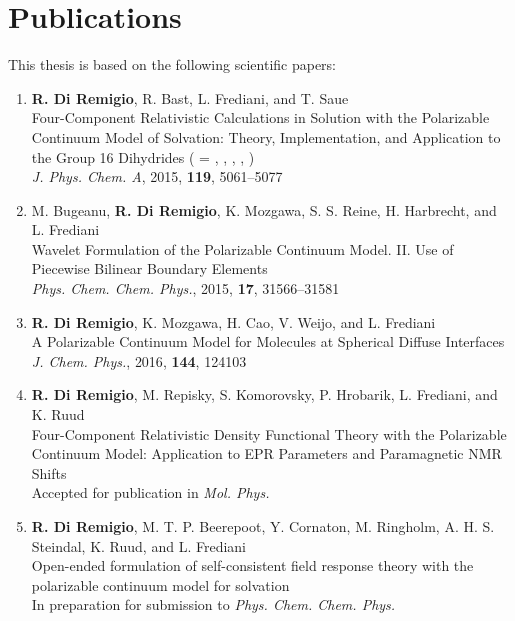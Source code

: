 \thispagestyle{empty}
\chapter*{Publications}

This thesis is based on the following scientific papers:

\begin{enumerate}[label=\textbf{\Roman{*} }, ref=\Roman{*}]

\item
  \textbf{R. Di Remigio}, R. Bast, L. Frediani, and T. Saue
  \\
  Four-Component Relativistic Calculations in Solution with the
  Polarizable Continuum Model of Solvation: Theory,
  Implementation, and Application to the Group 16 Dihydrides
   ( = , , , ,
  )
  \\
\textit{J. Phys. Chem. A}, \textrm{2015}, \textbf{119}, 5061--5077
\label{relapcm}

\item
  M. Bugeanu, \textbf{R. Di Remigio}, K. Mozgawa, S. S. Reine, H.
  Harbrecht,  and L. Frediani
  \\
  Wavelet Formulation of the Polarizable Continuum Model. II. Use of
  Piecewise Bilinear Boundary Elements
  \\
  \textit{Phys. Chem. Chem. Phys.}, \textrm{2015}, \textbf{17},
  31566--31581
\label{wemlin}

\item
  \textbf{R. Di Remigio}, K. Mozgawa, H. Cao, V. Weijo, and L.
  Frediani
  \\
  A Polarizable Continuum Model for Molecules at Spherical
  Diffuse Interfaces
  \\
  \textit{J. Chem. Phys.}, \textrm{2016}, \textbf{144}, 124103
\label{spherical}

\item
  \textbf{R. Di Remigio}, M. Repisky, S. Komorovsky, P. Hrobarik, L.
  Frediani, and K. Ruud
  \\
  Four-Component Relativistic Density Functional Theory with the
  Polarizable Continuum Model: Application to EPR Parameters
  and Paramagnetic NMR Shifts
  \\
  Accepted for publication in \textit{Mol. Phys.}
\label{pcmepr}

\item
  \textbf{R. Di Remigio}, M. T. P. Beerepoot, Y. Cornaton, M. Ringholm,
  A. H. S. Steindal, K. Ruud, and L. Frediani
  \\
  Open-ended formulation of self-consistent field response theory with
  the polarizable continuum model for solvation
  \\
  In preparation for submission to \textit{Phys. Chem. Chem. Phys.}
\label{pcmopenrsp}
\end{enumerate}
